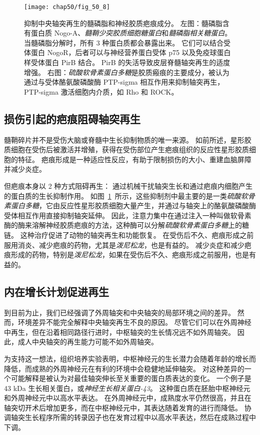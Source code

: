 \begin{figure}[htbp]
	\centering
	\texttt{[image: chap50/fig\_50\_8]}
	\caption{抑制中央轴突再生的髓磷脂和神经胶质疤痕成分\cite{yiu2006glial}。
		左图：髓磷脂含有蛋白质 Nogo-A、\textit{髓鞘少突胶质细胞糖蛋白}和\textit{髓磷脂相关糖蛋白}。
		当髓磷脂分解时，所有 3 种蛋白质都会暴露出来。
		它们可以结合受体蛋白 NogoR，后者可以与神经营养蛋白受体 p75 以及免疫球蛋白样受体蛋白 PirB 结合。
		PirB 的失活导致皮层脊髓轴突再生的适度增强。
		右图：\textit{硫酸软骨素蛋白多糖}是胶质瘢痕的主要成分，被认为通过与受体酪氨酸磷酸酶 PTP-sigma 相互作用来抑制轴突再生，PTP-sigma 激活细胞内介质，如 Rho 和 ROCK。}
	\label{fig:50_8}
\end{figure}



\subsection{损伤引起的疤痕阻碍轴突再生}

髓鞘碎片并不是受伤大脑或脊髓中生长抑制物质的唯一来源。
如前所述，星形胶质细胞在受伤后被激活并增殖，获得在受伤部位产生疤痕组织的反应性星形胶质细胞的特征。
疤痕形成是一种适应性反应，有助于限制损伤的大小、重建血脑屏障并减少炎症。


但疤痕本身以 2 种方式阻碍再生：
通过机械干扰轴突生长和通过疤痕内细胞产生的蛋白质的生长抑制作用。
如图~\ref{fig:50_8}~所示，这些抑制剂中最主要的是一类\textit{硫酸软骨素蛋白多糖}，它由反应性星形胶质细胞大量产生，并通过与轴突上的酪氨酸磷酸酶受体相互作用直接抑制轴突延伸。
因此，注意力集中在通过注入一种叫做软骨素酶的酶来溶解神经胶质疤痕的方法，这种酶可以分解\textit{硫酸软骨素蛋白多糖}上的糖链。
这种治疗促进了动物的轴突再生和功能恢复。
在受伤后不久、疤痕形成之前服用消炎、减少疤痕的药物，尤其是\textit{泼尼松龙}，也是有益的。
减少炎症和减少疤痕形成的药物，特别是\textit{泼尼松龙}，如果在受伤后不久、疤痕形成之前服用，也是有益的。



\subsection{内在增长计划促进再生}

到目前为止，我们已经强调了外周轴突和中央轴突的局部环境之间的差异。
然而，环境差异不能完全解释中央轴突再生不良的原因。
尽管它们可以在外周神经中再生，但在沿着相同路径行进时，中枢轴突的生长情况远不如外周轴突。
因此，成人中央轴突的再生能力可能不如外周轴突。


为支持这一想法，组织培养实验表明，中枢神经元的生长潜力会随着年龄的增长而降低，而成熟的外周神经元在有利的环境中会稳健地延伸轴突。
对这种差异的一个可能解释是被认为对最佳轴突伸长至关重要的蛋白质表达的变化。
一个例子是 43 kDa 生长相关蛋白，或\textit{神经生长相关蛋白-43}。
这种蛋白质在胚胎中枢神经元和外周神经元中以高水平表达。
在外周神经元中，成熟度水平仍然很高，并且在轴突切开术后增加更多，而在中枢神经元中，其表达随着发育的进行而降低。
协调轴突生长程序所需的转录因子也在发育过程中以高水平表达，然后在成熟过程中下调。


